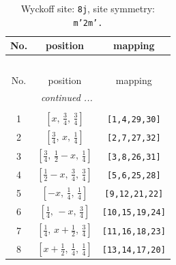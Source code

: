 \documentclass[fleqn,8pt]{jsarticle}
\begin{document}
\begin{longtable}{ccc}
\caption{Wyckoff site: {\tt 8j}, site symmetry: {\tt m'2m'.}}
 \\
 \hline \hline
No. & position & mapping \\ \hline \endfirsthead

\multicolumn{2}{l}{\tablename\ \thetable{}} \\
 \hline \hline
No. & position & mapping \\ \hline \endhead

 \hline \hline
\multicolumn{2}{r}{\footnotesize\it continued ...} \\ \endfoot

 \hline \hline
\multicolumn{2}{r}{} \\ \endlastfoot

1 & $\left[ x,\, \frac{3}{4},\, \frac{3}{4} \right]$ & {\tt [1,4,29,30]} \\ \hline
2 & $\left[ \frac{3}{4},\, x,\, \frac{1}{4} \right]$ & {\tt [2,7,27,32]} \\ \hline
3 & $\left[ \frac{3}{4},\, \frac{1}{2} - x,\, \frac{1}{4} \right]$ & {\tt [3,8,26,31]} \\ \hline
4 & $\left[ \frac{1}{2} - x,\, \frac{3}{4},\, \frac{3}{4} \right]$ & {\tt [5,6,25,28]} \\ \hline
5 & $\left[ - x,\, \frac{1}{4},\, \frac{1}{4} \right]$ & {\tt [9,12,21,22]} \\ \hline
6 & $\left[ \frac{1}{4},\, - x,\, \frac{3}{4} \right]$ & {\tt [10,15,19,24]} \\ \hline
7 & $\left[ \frac{1}{4},\, x + \frac{1}{2},\, \frac{3}{4} \right]$ & {\tt [11,16,18,23]} \\ \hline
8 & $\left[ x + \frac{1}{2},\, \frac{1}{4},\, \frac{1}{4} \right]$ & {\tt [13,14,17,20]} \\
\end{longtable}
\renewcommand{\arraystretch}{1.2}
\end{document}
